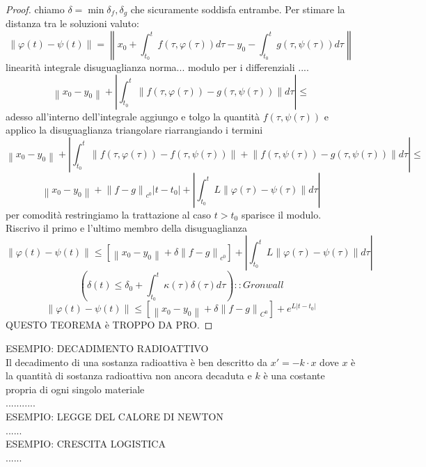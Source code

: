 \begin{proof}
	chiamo $\delta=\min{\delta_f,\delta_g}$ che sicuramente soddisfa entrambe. Per stimare la distanza tra le soluzioni valuto:
	$$
	\left\|\varphi(t)-\psi(t)\right\|=
	\left\|  x_0+\int_{t_0}^t f(\tau,\varphi(\tau))d\tau - y_0 - \int_{t_0}^t g(\tau,\psi(\tau))d\tau\right\|
	$$
	linearità integrale disuguaglianza norma... modulo per i differenziali ....\\
	$$ \left\| x_0-y_0\right\|+\left| \int_{t_0}^{t} \left\| f(\tau,\varphi(\tau))-g(\tau,\psi(\tau)) \right\|d\tau \right|\le$$
	adesso all'interno dell'integrale aggiungo e tolgo la quantità $f(\tau,\psi(\tau))$ e applico la disuguaglianza triangolare riarrangiando i termini
	$$ \left\| x_0-y_0\right\|+\left| \int_{t_0}^{t} \left\| f(\tau,\varphi(\tau))-f(\tau,\psi(\tau))\right\|+\left\|f(\tau,\psi(\tau))-g(\tau,\psi(\tau)) \right\|d\tau \right|\le$$
	$$ \left\| x_0-y_0\right\| + \left\| f-g\right\|_{c^0}\left|t-t_0\right| +\left| \int_{t_0}^{t} L\left\|\varphi(\tau)-\psi(\tau)\right\| d\tau \right|$$
	per comodità restringiamo la trattazione al caso $t>t_0$ sparisce il modulo. Riscrivo il primo e l'ultimo membro della disuguaglianza
	$$ \left\|\varphi(t)-\psi(t)\right\|\le  \left[ \left\| x_0-y_0\right\| + \delta\left\| f-g\right\|_{c^0}\right] +\left| \int_{t_0}^{t} L\left\|\varphi(\tau)-\psi(\tau)\right\| d\tau \right|$$
	$$ \left( \delta(t)\le\delta_0+\int_{t_0}^t \kappa(\tau)\delta(\tau)d\tau \right)::Gronwall$$
	$$ \left\| \varphi(t)-\psi(t)\right\|\le\left[\left\|x_0-y_0\right\|+\delta\left\|f-g\right\|_{C^0}\right]+e^{L\left|t-t_0\right|}$$
	QUESTO TEOREMA è TROPPO DA PRO.
\end{proof}
ESEMPIO: DECADIMENTO RADIOATTIVO\\
Il decadimento di una sostanza radioattiva è ben descritto da $ x'=-k\cdot x$ dove $x$ è la quantità di sostanza radioattiva non ancora decaduta e $k$ è una costante propria di ogni singolo materiale\\
...........\\
ESEMPIO: LEGGE DEL CALORE DI NEWTON\\
......\\
ESEMPIO: CRESCITA LOGISTICA\\
......\\
